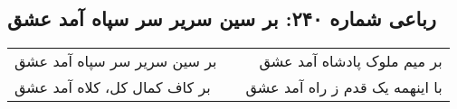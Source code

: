 \begin{center}
\section*{رباعی شماره ۲۴۰: بر سین سریر سر سپاه آمد عشق}
\label{sec:sh240}
\begin{longtable}{l p{0.5cm} r}
بر سین سریر سر سپاه آمد عشق
&&
بر میم ملوک پادشاه آمد عشق
\\
بر کاف کمال کل، کلاه آمد عشق
&&
با اینهمه یک قدم ز راه آمد عشق
\\
\end{longtable}
\end{center}
